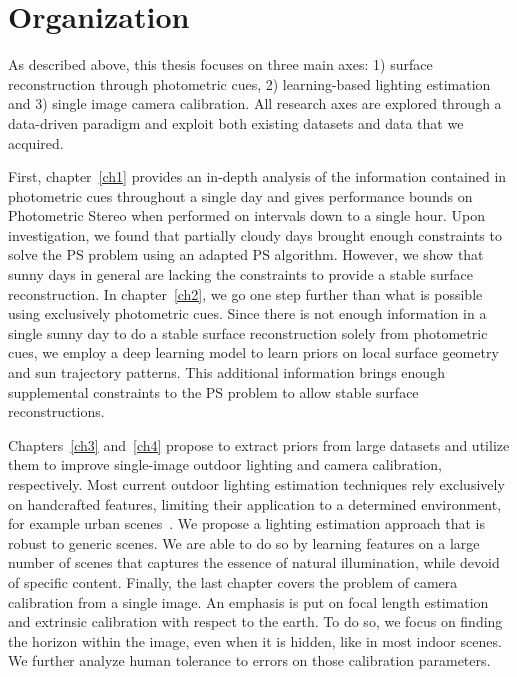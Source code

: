 \section*{Organization}

As described above, this thesis focuses on three main axes: 1) surface reconstruction through photometric cues, 2) learning-based lighting estimation and 3) single image camera calibration. All research axes are explored through a data-driven paradigm and exploit both existing datasets and data that we acquired. 

First, chapter~\ref{ch1} provides an in-depth analysis of the information contained in photometric cues throughout a single day and gives performance bounds on Photometric Stereo when performed on intervals down to a single hour. Upon investigation, we found that partially cloudy days brought enough constraints to solve the PS problem using an adapted PS algorithm. However, we show that sunny days in general are lacking the constraints to provide a stable surface reconstruction. In chapter~\ref{ch2}, we go one step further than what is possible using exclusively photometric cues. Since there is not enough information in a single sunny day to do a stable surface reconstruction solely from photometric cues, we employ a deep learning model to learn priors on local surface geometry and sun trajectory patterns. This additional information brings enough supplemental constraints to the PS problem to allow stable surface reconstructions. 

Chapters~\ref{ch3} and~\ref{ch4} propose to extract priors from large datasets and utilize them to improve single-image outdoor lighting and camera calibration, respectively. Most current outdoor lighting estimation techniques rely exclusively on handcrafted features, limiting their application to a determined environment, for example urban scenes~\cite{lalonde-ijcv-12}. We propose a lighting estimation approach that is robust to generic scenes. We are able to do so by learning features on a large number of scenes that captures the essence of natural illumination, while devoid of specific content. Finally, the last chapter covers the problem of camera calibration from a single image. An emphasis is put on focal length estimation and extrinsic calibration with respect to the earth. To do so, we focus on finding the horizon within the image, even when it is hidden, like in most indoor scenes. We further analyze human tolerance to errors on those calibration parameters. 

